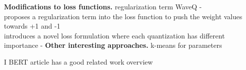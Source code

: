 \noindent
\textbf{Modifications to loss functions.}
regularization term WaveQ - \cite{DBLP:journals/corr/abs-2003-00146}\\
proposes a regularization term into the loss function to push the weight values towards +1 and -1 \cite{DBLP:conf/aaai/TangH017}\\
introduces a novel loss formulation where each quantization has different importance - \cite{DBLP:conf/iclr/HouYK17}
\noindent
\textbf{Other interesting approaches.}
k-means for parameters \cite{yunchao2014compressing}

I BERT article has a good related work overview